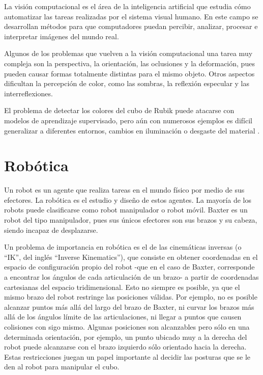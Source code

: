 La visión computacional es el área de la inteligencia artificial que estudia cómo automatizar las tareas realizadas por el sistema visual humano. En este campo se desarrollan métodos para que computadores puedan percibir, analizar, procesar e interpretar imágenes del mundo real\cite{vision}.

Algunos de los problemas que vuelven a la visión computacional una tarea muy compleja son la perspectiva, la orientación, las oclusiones y la deformación, pues pueden causar formas totalmente distintas para el mismo objeto\cite{aima}. Otros aspectos dificultan la percepción de color, como las sombras, la reflexión especular y las interreflexiones\cite{aima}.

El problema de detectar los colores del cubo de Rubik puede atacarse con modelos de aprendizaje supervisado, pero aún con numerosos ejemplos es difícil generalizar a diferentes entornos, cambios en iluminación o desgaste del material \cite{rubikcolors}.

\section*{Robótica}
Un robot es un agente que realiza tareas en el mundo físico por medio de sus efectores\cite{robotics}. La robótica es el estudio y diseño de estos agentes. La mayoría de los robots puede clasificarse como robot manipulador o robot móvil. Baxter es un robot del tipo manipulador, pues sus únicos efectores son sus brazos y su cabeza, siendo incapaz de desplazarse.

Un problema de importancia en robótica es el de las cinemáticas inversas\cite{ik} (o ``IK'', del inglés ``Inverse Kinematics''), que consiste en obtener coordenadas en el espacio de configuración propio del robot -que en el caso de Baxter, corresponde a encontrar los ángulos de cada articulación de un brazo- a partir de coordenadas cartesianas del espacio tridimensional. Esto no siempre es posible, ya que el mismo brazo del robot restringe las posiciones válidas. Por ejemplo, no es posible alcanzar puntos más allá del largo del brazo de Baxter, ni curvar los brazos más allá de los ángulos límite de las articulaciones, ni llegar a puntos que causen colisiones con sigo mismo. Algunas posiciones son alcanzables pero sólo en una determinada orientación, por ejemplo, un punto ubicado muy a la derecha del robot puede alcanzarse con el brazo izquierdo sólo orientado hacia la derecha. Estas restricciones juegan un papel importante al decidir las posturas que se le den al robot para manipular el cubo.


